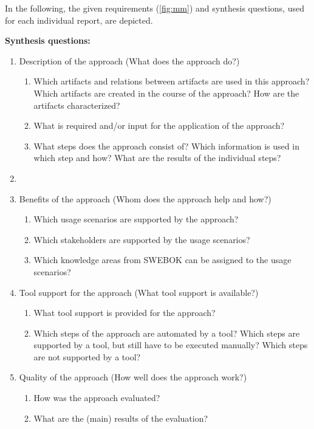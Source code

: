 In the following, the given requirements (\autoref{fig:mm}) and synthesis questions, used for each individual report, are depicted.

\newpage
\textbf{Synthesis questions:}

\begin{enumerate}
	\item Description of the approach (What does the approach do?)
	\begin{enumerate}
		\item Which artifacts and relations between artifacts are used in this approach? Which artifacts are created in the course of the approach? How are the artifacts characterized?
		\item What is required and/or input for the application of the approach?
		\item What steps does the approach consist of? Which information is used in which step and how? What are the results of the individual steps?
	\end{enumerate}
	\item[] 
	\item Benefits of the approach (Whom does the approach help and how?)
	\begin{enumerate}
		\item Which usage scenarios are supported by the approach?
		\item Which stakeholders are supported by the usage scenarios?
		\item Which knowledge areas from SWEBOK can be assigned to the usage scenarios?
	\end{enumerate}
	\item Tool support for the approach (What tool support is available?)
	\begin{enumerate}
		\item What tool support is provided for the approach?
		\item Which steps of the approach are automated by a tool? Which steps are supported by a tool, but still have to be executed manually? Which steps are not supported by a tool?
	\end{enumerate}
	\item Quality of the approach (How well does the approach work?)
	\begin{enumerate}
		\item How was the approach evaluated?
		\item What are the (main) results of the evaluation?
	\end{enumerate}
\end{enumerate}


